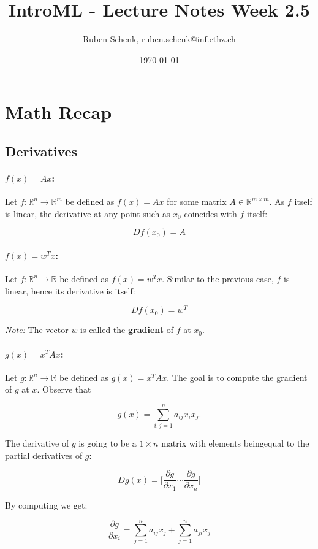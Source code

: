 \documentclass[a4paper]{extarticle}
\title{IntroML - Lecture Notes Week 2.5}
\author{Ruben Schenk, ruben.schenk@inf.ethz.ch}
\date{\today}
\begin{document}
\maketitle

\section{Math Recap}

\subsection{Derivatives}

\paragraph{\(f(x) = Ax\):} Let \(f : \mathbb{R}^n \to \mathbb{R}^m\) be defined as \(f(x) = Ax\) for some matrix \(A \in \mathbb{R}^{m \times m}\). As \(f\) itself is linear, the derivative at any point such as \(x_0\) coincides with \(f\) itself:

\[
    Df(x_0) = A
\]

\paragraph{\(f(x) = w^Tx\):} Let \(f : \mathbb{R}^n \to \mathbb{R}\) be defined as \(f(x) = w^Tx\). Similar to the previous case, \(f\) is linear, hence its derivative is itself:

\[
    Df(x_0) = w^T
\]

\textit{Note:} The vector \(w\) is called the \textbf{gradient} of \(f\) at \(x_0\).

\paragraph{\(g(x) = x^TAx\):} Let \(g : \mathbb{R}^n \to \mathbb{R}\) be defined as \(g(x) = x^TAx\). The goal is to compute the gradient of \(g\) at \(x\). Observe that

\[
    g(x) = \sum_{i,j = 1}^n a_{ij}x_ix_j.
\]

The derivative of \(g\) is going to be a \(1 \times n\) matrix with elements beingequal to the partial derivatives of \(g\):

\[
    Dg(x) = \lbrack \frac{\partial g}{\partial x_1} \cdots \frac{\partial g}{\partial x_n} \rbrack
\]

By computing we get:

\[
    \frac{\partial g}{\partial x_i} = \sum_{j = 1}^n a_{ij}x_j + \sum_{j = 1}^n a_{ji}x_j
\]
\end{document}
